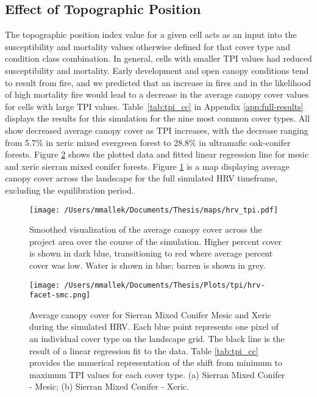 \clearpage


\subsection{Effect of Topographic Position}

The topographic position index value for a given cell acts as an input into the susceptibility and mortality values otherwise defined for that cover type and condition class combination. In general, cells with smaller TPI values had reduced susceptibility and mortality. Early development and open canopy conditions tend to result from fire, and we predicted that an increase in fires and in the likelihood of high mortality fire would lead to a decrease in the average canopy cover values for cells with large TPI values. Table~\ref{tab:tpi_cc} in Appendix \ref{app:full-results} displays the results for this simulation for the nine most common cover types. All  show decreased average canopy cover as TPI increases, with the decrease ranging from 5.7\% in xeric mixed evergreen forest to 28.8\% in ultramafic oak-conifer forests. Figure \ref{fig:tpi_cc_smc} shows the plotted data and fitted linear regression line for mesic and xeric sierran mixed conifer forests. Figure \ref{fig:averagecc} is a map displaying average canopy cover across the landscape for the full simulated HRV timeframe, excluding the equilibration period. 

\begin{figure}[!htbp]
\centering
\texttt{[image: /Users/mmallek/Documents/Thesis/maps/hrv\_tpi.pdf]}
\caption{Smoothed visualization of the average canopy cover across the project area over the course of the simulation. Higher percent cover is shown in dark blue, transitioning to red where average percent cover was low. Water is shown in blue; barren is shown in grey.}
\label{fig:averagecc}
\end{figure}

\begin{figure}[!htbp]
\centering
\texttt{[image: /Users/mmallek/Documents/Thesis/Plots/tpi/hrv-facet-smc.png]}
\caption{Average canopy cover for Sierran Mixed Conifer Mesic and Xeric during the simulated HRV. Each blue point represents one pixel of an individual cover type on the landscape grid. The black line is the result of a linear regression fit to the data. Table \ref{tab:tpi_cc} provides the numerical representation of the shift from minimum to maximum TPI values for each cover type. (a) Sierran Mixed Conifer - Mesic; (b) Sierran Mixed Conifer - Xeric.} 
\label{fig:tpi_cc_smc}
\end{figure}


